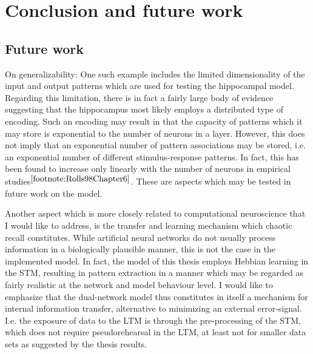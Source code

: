 
\chapter{Conclusion and future work}\label{chpt:conclusion}


\section{Future work}


On generalizability: One such example includes the limited dimensionality of the input and output patterns which are used for testing the hippocampal model. Regarding this limitation, there is in fact a fairly large body of evidence suggesting that the hippocampus most likely employs a distributed type of encoding. Such an encoding may result in that the capacity of patterns which it may store is exponential to the number of neurons in a layer.
However, this does not imply that an exponential number of pattern associations may be stored, i.e. an exponential number of different stimulus-response patterns. In fact, this has been found to increase only linearly with the number of neurons in empirical studies$^{\ref{footnote:Rolls98Chapter6}}$. These are aspects which may be tested in future work on the model.

Another aspect which is more closely related to computational neuroscience that I would like to address, is the transfer and learning mechanism which chaotic recall constitutes.
While artificial neural networks do not usually process information in a biologically plausible manner, this is not the case in the implemented model. In fact, the model of this thesis employs Hebbian learning in the STM, resulting in pattern extraction in a manner which may be regarded as fairly realistic at the network and model behaviour level.
I would like to emphasize that the dual-network model thus constitutes in itself a mechanism for internal information transfer, alternative to minimizing an external error-signal. I.e. the exposure of data to the LTM is through the pre-processing of the STM, which does not require pseudorehearsal in the LTM, at least not for smaller data sets as suggested by the thesis results.

